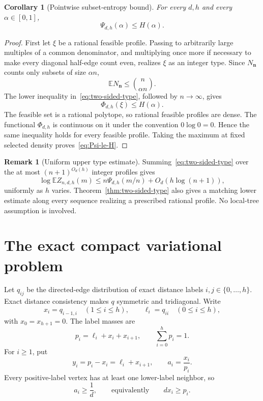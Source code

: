 \documentclass[11pt]{amsart}
\newtheorem{corollary}[theorem]{Corollary}
\theoremstyle{definition}
\newtheorem{remark}[theorem]{Remark}
\newcommand{\E}{\mathbb E}
\begin{document}
\begin{corollary}[Pointwise subset-entropy bound]\label{cor:Psi-le-H}
For every $d,h$ and every $\alpha\in[0,1]$,
\begin{equation}\label{eq:Psi-le-H}
 \boxed{\Psi_{d,h}(\alpha)\le H(\alpha).}
\end{equation}
\end{corollary}

\begin{proof}
First let $\xi$ be a rational feasible profile.  Passing to arbitrarily large multiples of a common denominator, and multiplying once more if necessary to make every diagonal half-edge count even, realizes $\xi$ as an integer type.  Since $N_{\mathbf n}$ counts only subsets of size $\alpha n$,
\[
 \E N_{\mathbf n}\le\binom n{\alpha n}.
\]
The lower inequality in~\eqref{eq:two-sided-type}, followed by $n\to\infty$, gives
\[
 \Phi_{d,h}(\xi)\le H(\alpha).
\]
The feasible set is a rational polytope, so rational feasible profiles are dense.  The functional $\Phi_{d,h}$ is continuous on it under the convention $0\log0=0$.  Hence the same inequality holds for every feasible profile.  Taking the maximum at fixed selected density proves~\eqref{eq:Psi-le-H}.
\end{proof}

\begin{remark}[Uniform upper type estimate]\label{rem:upper-type}
Summing~\eqref{eq:two-sided-type} over the at most $(n+1)^{O_d(h)}$ integer profiles gives
\[
 \log\E Z_{n,d,h}(m)
 \le n\Psi_{d,h}(m/n)+O_d(h\log(n+1)),
\]
uniformly as $h$ varies.  Theorem~\ref{thm:two-sided-type} also gives a matching lower estimate along every sequence realizing a prescribed rational profile.  No local-tree assumption is involved.
\end{remark}


\section{The exact compact variational problem}\label{sec:compact}
Let $q_{ij}$ be the directed-edge distribution of exact distance labels $i,j\in\{0,\dots,h\}$.  Exact distance consistency makes $q$ symmetric and tridiagonal.  Write
\[
 x_i=q_{i-1,i}\quad(1\le i\le h),
 \qquad
 \ell_i=q_{ii}\quad(0\le i\le h),
\]
with $x_0=x_{h+1}=0$.  The label masses are
\[
 p_i=\ell_i+x_i+x_{i+1},
 \qquad
 \sum_{i=0}^h p_i=1.
\]
For $i\ge1$, put
\[
 y_i=p_i-x_i=\ell_i+x_{i+1},
 \qquad
 a_i=\frac{x_i}{p_i}.
\]
Every positive-label vertex has at least one lower-label neighbor, so
\[
 a_i\ge\frac1d,
 \qquad\text{equivalently}\qquad
 d x_i\ge p_i.
\]
\end{document}
